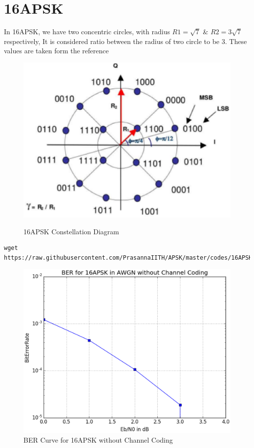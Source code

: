 \documentclass[journal,12pt,twocolumn]{IEEEtran}
\begin{document}
\section{16APSK}
In 16APSK, we have two concentric circles, with radius $R1 = \sqrt{7}$ \& $ R2 = 3\sqrt{7}$ respectively, It is considered ratio between the radius of two circle to be 3. These values are taken form the reference \cite{b1}
\begin{figure}[h!]
\centering
\includegraphics[scale=0.4]{figs/16APSK.eps}
\label{16APSK Constellation Diagram}
\caption{16APSK Constellation Diagram}
\end{figure}

\begin{lstlisting}
wget https://raw.githubusercontent.com/PrasannaIITH/APSK/master/codes/16APSK.py
\end{lstlisting}

\begin{figure}[h!]
\centering
\includegraphics[scale=0.32]{figs/16APSK_ber.eps}
\caption{\small{BER Curve for 16APSK without Channel Coding}}
\label{BER Curve for 16APSK without Channel Coding}
\end{figure}
\end{document}
